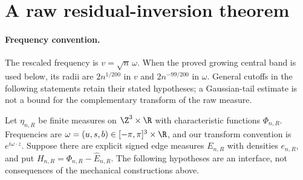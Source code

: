 \section{A raw residual-inversion theorem}

\paragraph{Frequency convention.}
The rescaled frequency is $v=\sqrt n\,\omega$. When the proved growing
central band is used below, its radii are $2n^{1/200}$ in $v$ and
$2n^{-99/200}$ in $\omega$. General cutoffs in the following statements
retain their stated hypotheses; a Gaussian-tail estimate is not a bound
for the complementary transform of the raw measure.

Let $\eta_{n,R}$ be finite measures on $\Z^3\times\R$ with characteristic functions $\Phi_{n,R}$. Frequencies are $\omega=(u,s,b)\in[-\pi,\pi]^3\times\R$, and our transform convention is $e^{i\omega\cdot z}$. Suppose there are explicit signed edge measures $E_{n,R}$ with densities $e_{n,R}$, and put $H_{n,R}=\Phi_{n,R}-\widehat E_{n,R}$. The following hypotheses are an interface, not consequences of the mechanical constructions above.

